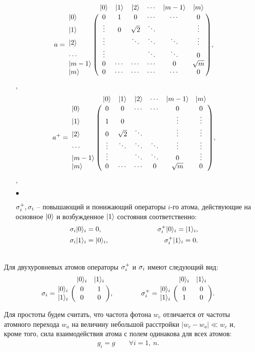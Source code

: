 \begin{itemize}
{		\begin{equation}
			a =
			\bordermatrix{
				& |0\ra & |1\ra & |2\ra & \cdots & |m-1\ra & |m\ra \cr
				|0\ra & 0 & 1 & 0 & \cdots & \cdots & 0 \cr
				|1\ra & \vdots & 0 & \sqrt{2} & \ddots &  & \vdots \cr
				|2\ra & \vdots &  & \ddots & \ddots & \ddots & \vdots \cr
				\cdots & \vdots &  &  & \ddots & \ddots & 0 \cr
				|m-1\ra & 0 & \cdots & \cdots & \cdots & 0 & \sqrt{m} \cr
				|m\ra & 0 & \cdots & \cdots & \cdots & \cdots & 0\cr
			},
		\end{equation}
	},\\[12pt]
	\begin{equation}
		a^{+} =
		\bordermatrix{
			& |0\ra & |1\ra & |2\ra & \cdots & |m-1\ra & |m\ra \cr
			|0\ra & 0 & 0 & \cdots & \cdots & 0 & 0 \cr
			|1\ra & 1 & 0 &  &  & \vdots & \vdots \cr
			|2\ra & 0 & \sqrt{2} & \ddots & & \vdots & \vdots \cr
			\cdots & \vdots & \ddots & \ddots & \ddots & \vdots & \vdots \cr
			|m-1\ra & \vdots &  & \ddots & \ddots & 0 & \vdots \cr
			|m\ra & 0 & \cdots & \cdots & 0 & \sqrt{m} & 0\cr
		},
	\end{equation}
	,\\
	\item[$\bullet$]{$\sigma^{+}_{i}, \sigma_{i}$ -- повышающий и понижающий операторы $i$-го атома, действующие на основное $|0\rangle$ и возбужденное $|1\rangle$ состояния соответственно:\\
		\begin{equation}
			\begin{split}
				\s_{i}|0\ra_{i} = 0,\qquad\qquad\qquad\qquad\s^{+}_{i}|0\ra_{i} = |1\ra_{i},\\
				\noindent\s_{i}|1\ra_{i} = |0\ra_{i},\qquad\qquad\qquad\qquad\s^{+}_{i}|1\ra_{i} = 0.
			\end{split}
		\end{equation}
		
	}
\end{itemize}
\
\\[12pt]
Для двухуровневых атомов операторы $\sigma^{+}_{i}$ и $\sigma_{i}$ имеют следующий вид:
\begin{equation}
	\s_{i} = \bordermatrix{
		& |0\ra_{i} & |1\ra_{i} \cr 
		|0\ra_{i} & 0 & 1 \cr 
		|1\ra_{i} & 0 & 0 \cr
	},
	\qquad\qquad
	\s_{i}^{+} = \bordermatrix{ 
		& |0\ra_{i} & |1\ra_{i} \cr
		|0\ra_{i} & 0 & 0 \cr
		|1\ra_{i} & 1 & 0 \cr 
	}.
\end{equation}

Для простоты будем считать, что частота фотона $w_{c}$ отличается от частоты атомного
перехода $w_{a}$ на величину небольшой расстройки $|w_{c} - w_{a}| \ll w_{c}$ и, кроме того, сила взаимодействия атома с полем одинакова для всех атомов:
\[
g_{i} = g\qquad\forall i = \overline{1,~n}.
\]

